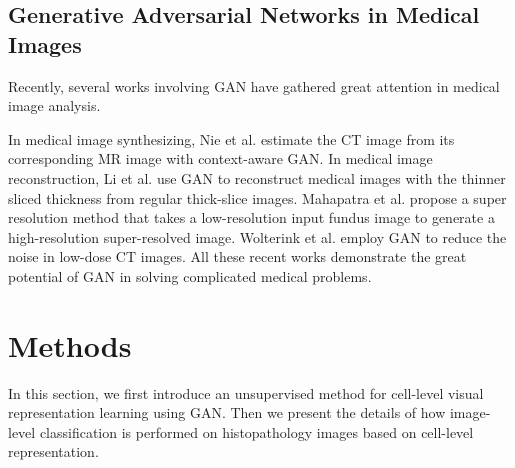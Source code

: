 \documentclass[journal]{IEEEtran}
\begin{document}
\subsection{Generative Adversarial Networks in Medical Images}
Recently, several works involving GAN have gathered great attention in medical image analysis. 

In medical image synthesizing, Nie et al. \cite{nie2017medical} estimate the CT image from its corresponding MR image with context-aware GAN. In medical image reconstruction, Li et al. \cite{Li2017Reconstruction} use GAN to reconstruct medical images with the thinner sliced thickness from regular thick-slice images. Mahapatra et al. \cite{Mahapatra2017Image} propose a super resolution method that takes a low-resolution input fundus image to generate a high-resolution super-resolved image. Wolterink et al. \cite{Wolterink2017Generative} employ GAN to reduce the noise in low-dose CT images. All these recent works demonstrate the great potential of GAN in solving complicated medical problems.

\section{Methods}

In this section, we first introduce an unsupervised method for cell-level visual representation learning using GAN. Then we present the details of how image-level classification is performed on histopathology images based on cell-level representation. 
\end{document}
